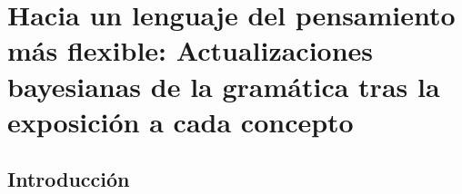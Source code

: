 

\chapter{Hacia un lenguaje del pensamiento más flexible: Actualizaciones bayesianas de la gramática tras la exposición a cada concepto}\label{chapter:PRE}

\section{Introducción}


